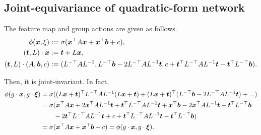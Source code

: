 \subsection{Joint-equivariance of quadratic-form network} \label{sec:proof.quad-equivariant}

The feature map and group actions are given as follows.
\begin{align*}
    \phi(\bm{x},\xi) &:= \sigma( \bm{x}^\top A \bm{x} + \bm{x}^\top \bm{b} + c ),\\
    (\bm{t},L) \cdot \bm{x} &:= \bm{t} + L\bm{x}, \\
    (\bm{t},L) \cdot (A,\bm{b},c)
    &:= (L^{-\top}AL^{-1}, L^{-\top}\bm{b}-2L^{-\top}AL^{-1}\bm{t},
    c + \bm{t}^\top L^{-\top}AL^{-1}\bm{t} - \bm{t}^\top L^{-\top}\bm{b}).
\end{align*}

Then, it is joint-invariant. In fact,
\begin{align*}
    \phi(g \cdot \bm{x}, g \cdot \bm{\xi})
    &= \sigma( (L \bm{x} + \bm{t})^\top L^{-\top}AL^{-1} (L\bm{x}+\bm{t})
     + (L\bm{x}+\bm{t})^\top(L^{-\top}\bm{b}-2L^{-\top}AL^{-1}\bm{t}) + ... )\\
    &= \sigma( \bm{x}^\top A \bm{x} + 2 \bm{x}^\top A L^{-1}\bm{t} + \bm{t}^\top L^{-\top}AL^{-1}\bm{t}
     + \bm{x}^\top\bm{b} - 2 \bm{x}^\top A L^{-1}\bm{t} + \bm{t}^\top L^{-\top}\bm{b}\\
     &\qquad - 2\bm{t}^\top L^{-\top}AL^{-1}\bm{t} + c + \bm{t}^\top L^{-\top}AL^{-1}\bm{t} - \bm{t}^\top L^{-\top}\bm{b})\\
    &= \sigma(\bm{x}^\top A \bm{x} + \bm{x}^\top\bm{b} + c) = \phi(g \cdot \bm{x}, g \cdot \bm{\xi}).
\end{align*}
